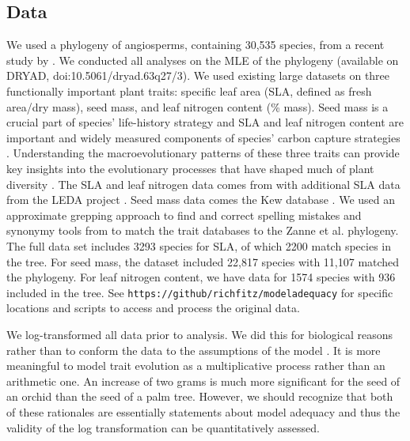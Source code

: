 \subsection{Data}
We used a phylogeny of angiosperms, containing 30,535 species, from a recent study by \citet{Zanne2013}.  We conducted all analyses on the MLE of the phylogeny (available on DRYAD, doi:10.5061/dryad.63q27/3). We used existing large datasets on three functionally important plant traits: specific leaf area (SLA, defined as fresh area/dry mass), seed mass, and leaf nitrogen content (\% mass). Seed mass is a crucial part of species' life-history strategy \citep{Leishman2000, Westoby2002} and SLA and leaf nitrogen content are important and widely measured components of species' carbon capture strategies \citep{Wright2004}. Understanding the macroevolutionary patterns of these three traits can provide key insights into the evolutionary processes that have shaped much of plant diversity \citep{ksi}. The SLA and leaf nitrogen data comes from \citet{Wright2004} with additional SLA data from the LEDA project \citep{Kleyer2008}. Seed mass data comes the Kew database \citep{Kew2008}. We used an approximate grepping approach to find and correct spelling mistakes and synonymy tools from \citet{theplantlist} to match the trait databases to the Zanne et al. phylogeny. 
The full data set includes 3293 species for SLA, of which 2200 match species in the \citet{Zanne2013} tree. For seed mass, the dataset included 22,817 species with 11,107 matched the phylogeny. For leaf nitrogen content, we have data for 1574 species with 936 included in the tree. 
%
See \texttt{https://github/richfitz/modeladequacy} for specific locations and scripts to access and process the original data. 

We log-transformed all data prior to analysis. We did this for biological reasons rather than to conform the data to the assumptions of the model \citep{Houle2011}. It is more meaningful to model trait evolution as a multiplicative process rather than an arithmetic one. An increase of two grams is much more significant for the seed of an orchid than the seed of a palm tree. However, we should recognize that both of these rationales are essentially statements about model adequacy and thus the validity of the log transformation can be quantitatively assessed.

